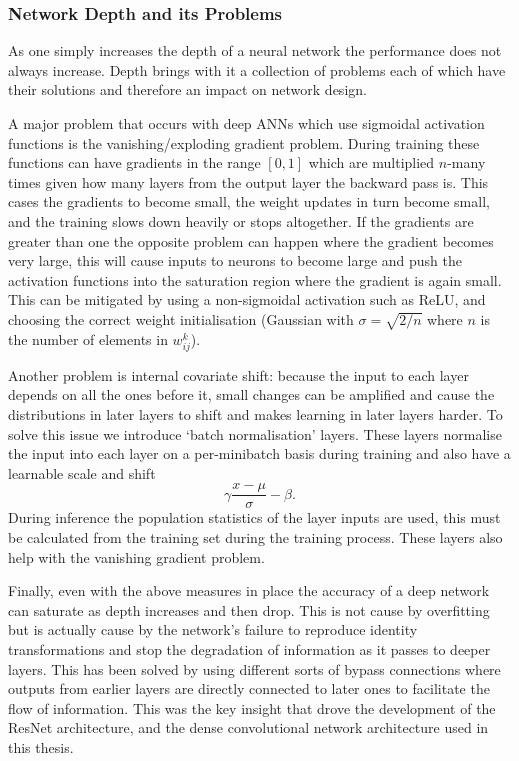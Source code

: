 \subsubsection{Network Depth and its Problems}
As one simply increases the depth of a neural network the performance does not always increase. Depth brings with it a collection of problems each of which have their solutions and therefore an impact on network design. 

A major problem that occurs with deep ANNs which use sigmoidal activation functions is the vanishing/exploding gradient problem. During training these functions can have gradients in the range $[0,1]$ which are multiplied $n$-many times given how many layers from the output layer the backward pass is. This cases the gradients to become small, the weight updates in turn become small, and the training slows down heavily or stops altogether. If the gradients are greater than one the opposite problem can happen where the gradient becomes very large, this will cause inputs to neurons to become large and push the activation functions into the saturation region where the gradient is again small. 
This can be mitigated by using a non-sigmoidal activation such as ReLU, and choosing the correct weight initialisation (Gaussian with $\sigma=\sqrt{2/n}$ where $n$ is the number of elements in $w_{ij}^{k}$). 

Another problem is internal covariate shift: because the input to each layer depends on all the ones before it, small changes can be amplified and cause the distributions in later layers to shift and makes learning in later layers harder. 
To solve this issue we introduce `batch normalisation' layers. These layers normalise the input into each layer on a per-minibatch basis during training and also have a learnable scale and shift
\begin{equation}
    \gamma\frac{x-\mu}{\sigma} - \beta.
\end{equation}
During inference the population statistics of the layer inputs are used, this must be calculated from the training set during the training process. These layers also help with the vanishing gradient problem. 

Finally, even with the above measures in place the accuracy of a deep network can saturate as depth increases and then drop. This is not cause by overfitting but is actually cause by the network's failure to reproduce identity transformations and stop the degradation of information as it passes to deeper layers. This has been solved by using different sorts of bypass connections where outputs from earlier layers are directly connected to later ones to facilitate the flow of information. This was the key insight that drove the development of the ResNet architecture, and the dense convolutional network architecture used in this thesis.  


